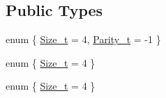 \subsection*{Public Types}
\begin{DoxyCompactItemize}
\item 
enum \{ \mbox{\hyperlink{structHadron_1_1HuRep_a43686c1c11b058cccdc4e7f8cdb93cc8a11f941d99fca7e86652c1460d6c185ed}{Size\+\_\+t}} = 4, 
\mbox{\hyperlink{structHadron_1_1HuRep_a9ec388d81123fad6325ebf58fb2e2cc3aa750a82d32ba8a198ebecc777b696686}{Parity\+\_\+t}} = -\/1
 \}
\item 
enum \{ \mbox{\hyperlink{structHadron_1_1HuRep_a43686c1c11b058cccdc4e7f8cdb93cc8a11f941d99fca7e86652c1460d6c185ed}{Size\+\_\+t}} = 4
 \}
\item 
enum \{ \mbox{\hyperlink{structHadron_1_1HuRep_a43686c1c11b058cccdc4e7f8cdb93cc8a11f941d99fca7e86652c1460d6c185ed}{Size\+\_\+t}} = 4
 \}
\end{DoxyCompactItemize}
